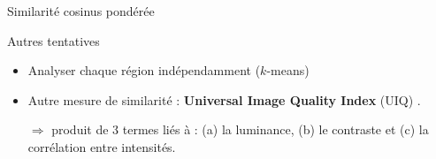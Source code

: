 \documentclass[10pt]{beamer}
\begin{document}
\begin{frame}{Similarité cosinus pondérée}
\begin{figure}[ht]
  \end{figure}
\end{frame}

\begin{frame}{Autres tentatives}

  

  \begin{itemize}
  \item Analyser chaque région indépendamment ($k$-means)
  \item  Autre mesure de similarité : \textbf{Universal Image Quality Index} (UIQ) \cite{Zhou_Wang_2002}.
    
  $\Rightarrow$ produit de 3 termes liés à : (a) la luminance, (b) le contraste et (c) la corrélation entre intensités.
\end{itemize}


\end{frame}
\end{document}
